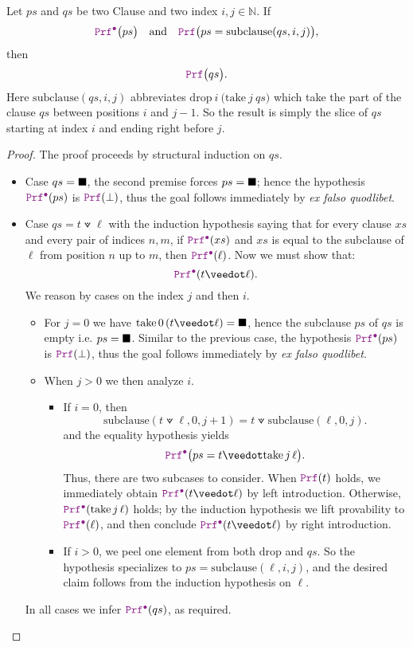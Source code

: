 \begin{lemma}\label{lem:orN_subList}
Let $ps$ and $qs$ be two Clause and two index $i,j \in \mathbb{N}$. If
\[
\prfcl\bigl(ps\bigr)
\quad\text{and}\quad
\prf\bigl(ps = \mathrm{subclause}(qs,i,j)\bigr),
\]
then
\[
\prf\bigl(qs\bigr).
\]
Here $\mathrm{subclause}(qs,i,j)$ abbreviates $\mathrm{drop}~i~\bigl(\mathrm{take}~j~qs\bigr)$ which take the part of the clause $qs$ between positions $i$ and $j-1$.
So the result is simply the slice of $qs$ starting at index  $i$ and ending right before $j$.
\begin{proof}
The proof proceeds by structural induction on $qs$.
\begin{itemize}
  \item[] Case $qs=\blacksquare$, the second premise forces $ps=\blacksquare$; hence the hypothesis $\prfcl(ps)$ is $\prf(\bot)$, thus the goal follows immediately by \emph{ex falso quodlibet}.
  \item[] Case $qs=t \veedot \ell$ with the induction hypothesis saying that for every clause $xs$ and every pair of indices $n,m$, if $\prfcl(xs)$ and $xs$ is equal to the subclause of $\ell$ from position $n$ up to $m$, then $\prfcl(\ell)$.
    Now we must show that:
    \[
        \prfcl (t \veedot \ell).
    \]
    We reason by cases on the index $j$ and then $i$.
    \begin{itemize}
      \item For $j=0$ we have $\mathrm{take}\,0\,(t \veedot \ell)=\nil$, hence the subclause $ps$ of $qs$ is empty i.e. $ps = \blacksquare$.
      Similar to the previous case, the hypothesis $\prfcl(ps)$ is $\prf(\bot)$, thus the goal follows immediately by \emph{ex falso quodlibet}.

      \item When $j > 0$ we then analyze $i$.
        \begin{itemize}
          \item If $i=0$, then
            \[
              \mathrm{subclause}(t \veedot \ell,0,j{+}1)= t \veedot \mathrm{subclause}(\ell,0,j).
            \]
            and the equality hypothesis yields
            \[
              \prfcl\bigl(ps = t \veedot \mathrm{take}\,j\,\ell\bigr).
            \]
            Thus, there are two subcases to consider.
            When $\prf(t)$ holds, we immediately obtain $\prfcl(t \veedot \ell)$ by left introduction.
            Otherwise, $\prfcl(\mathrm{take}\,j\,\ell)$ holds; by the induction hypothesis we lift provability to $\prfcl(\ell)$, and then conclude $\prfcl(t \veedot \ell)$ by right introduction.
          \item If $i > 0$, we peel one element from both $\mathrm{drop}$ and $qs$.
            So the hypothesis specializes to $ps=\mathrm{subclause}(\ell,i,j)$, and the desired claim follows from the induction hypothesis on $\ell$.
          \end{itemize}
    \end{itemize}
  In all cases we infer $\prfcl(qs)$, as required.
\end{itemize}
\end{proof}
\end{lemma}

